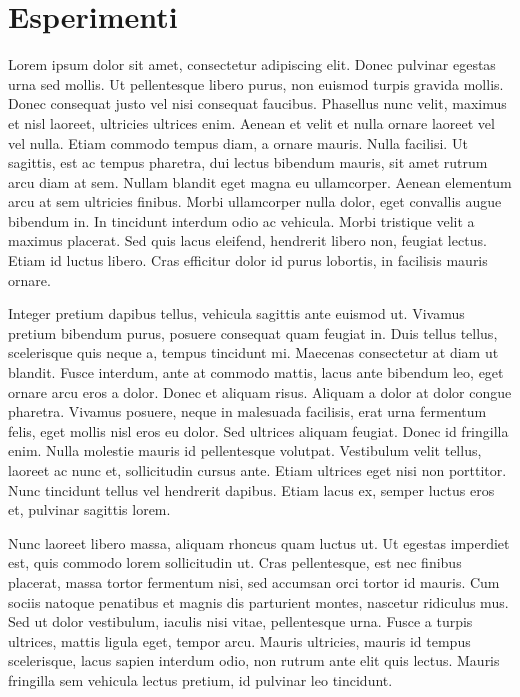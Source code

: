 \chapter{Esperimenti}

Lorem ipsum dolor sit amet, consectetur adipiscing elit. Donec pulvinar egestas urna sed mollis. Ut pellentesque libero purus, non euismod turpis gravida mollis. Donec consequat justo vel nisi consequat faucibus. Phasellus nunc velit, maximus et nisl laoreet, ultricies ultrices enim. Aenean et velit et nulla ornare laoreet vel vel nulla. Etiam commodo tempus diam, a ornare mauris. Nulla facilisi. Ut sagittis, est ac tempus pharetra, dui lectus bibendum mauris, sit amet rutrum arcu diam at sem. Nullam blandit eget magna eu ullamcorper. Aenean elementum arcu at sem ultricies finibus. Morbi ullamcorper nulla dolor, eget convallis augue bibendum in. In tincidunt interdum odio ac vehicula. Morbi tristique velit a maximus placerat. Sed quis lacus eleifend, hendrerit libero non, feugiat lectus. Etiam id luctus libero. Cras efficitur dolor id purus lobortis, in facilisis mauris ornare.

Integer pretium dapibus tellus, vehicula sagittis ante euismod ut. Vivamus pretium bibendum purus, posuere consequat quam feugiat in. Duis tellus tellus, scelerisque quis neque a, tempus tincidunt mi. Maecenas consectetur at diam ut blandit. Fusce interdum, ante at commodo mattis, lacus ante bibendum leo, eget ornare arcu eros a dolor. Donec et aliquam risus. Aliquam a dolor at dolor congue pharetra. Vivamus posuere, neque in malesuada facilisis, erat urna fermentum felis, eget mollis nisl eros eu dolor. Sed ultrices aliquam feugiat. Donec id fringilla enim. Nulla molestie mauris id pellentesque volutpat. Vestibulum velit tellus, laoreet ac nunc et, sollicitudin cursus ante. Etiam ultrices eget nisi non porttitor. Nunc tincidunt tellus vel hendrerit dapibus. Etiam lacus ex, semper luctus eros et, pulvinar sagittis lorem.

Nunc laoreet libero massa, aliquam rhoncus quam luctus ut. Ut egestas imperdiet est, quis commodo lorem sollicitudin ut. Cras pellentesque, est nec finibus placerat, massa tortor fermentum nisi, sed accumsan orci tortor id mauris. Cum sociis natoque penatibus et magnis dis parturient montes, nascetur ridiculus mus. Sed ut dolor vestibulum, iaculis nisi vitae, pellentesque urna. Fusce a turpis ultrices, mattis ligula eget, tempor arcu. Mauris ultricies, mauris id tempus scelerisque, lacus sapien interdum odio, non rutrum ante elit quis lectus. Mauris fringilla sem vehicula lectus pretium, id pulvinar leo tincidunt.
